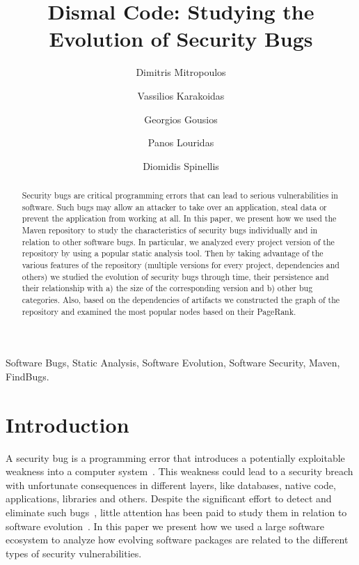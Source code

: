 \documentclass[conference]{llncs}
\begin{document}
\title{Dismal Code: Studying the Evolution of Security Bugs}

\author{Dimitris Mitropoulos    \and
       Vassilios Karakoidas	\and
       Georgios Gousios         \and
       Panos Louridas		\and
       Diomidis Spinellis
}

\maketitle

\begin{abstract}
Security bugs are critical programming errors that can lead to serious
vulnerabilities in software. Such bugs may allow an attacker to take over
an application, steal data or prevent the application from working at all.
In this paper, we present how we used the Maven repository to study the
characteristics of security bugs individually and in relation to other software
bugs. In particular, we analyzed every project version of the repository by using a
popular static analysis tool. Then by taking advantage of the various features of
the repository (multiple versions for every project, dependencies and others) we studied
the evolution of security bugs through time, their persistence and their relationship with a) the
size of the corresponding version and b) other bug categories. Also, based on the
dependencies of artifacts we constructed the graph of the repository and
examined the most popular nodes based on their PageRank. 
\end{abstract}

\begin{keywords}
Software Bugs, Static Analysis, Software Evolution, Software
Security, Maven, FindBugs.
\end{keywords}

\section{Introduction}

A security bug is a programming error that introduces a potentially
exploitable weakness into a computer system~\cite{SSL12}\cite{TJBD11}. This weakness could lead to a
security breach with unfortunate consequences in different layers, like databases,
native code, applications, libraries and others. Despite the significant
effort to detect and eliminate such bugs~\cite{SZ12}, little attention has been paid to
study them in relation to software evolution~\cite{L96}\cite{LRWPT97}\cite{IB06}\cite{RGMA06}.
In this paper we present how we used a large software ecosystem to analyze
how evolving software packages are related to the different types of security
vulnerabilities.
\end{document}
